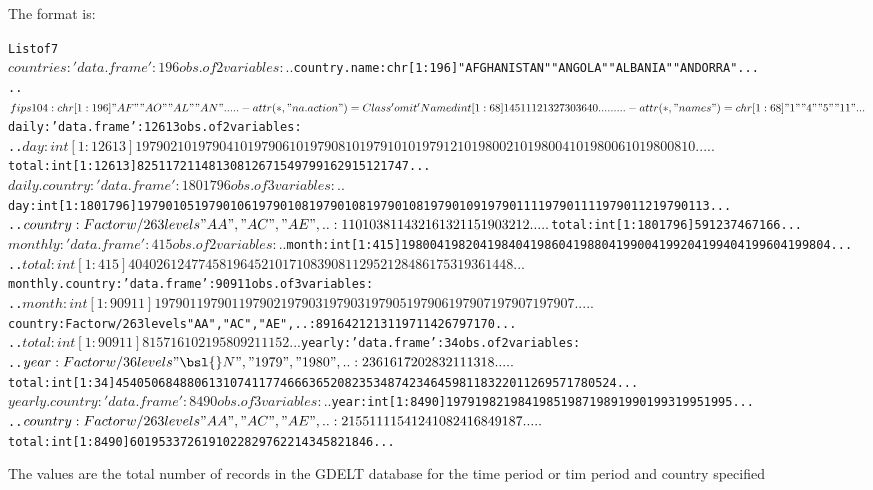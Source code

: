 \documentclass[a4paper]{book}
\begin{document}
\begin{Format}
The format is:
\begin{alltt}List of 7
 $ countries      :'data.frame':	196 obs. of  2 variables:
  ..$ country.name: chr [1:196] "AFGHANISTAN" "ANGOLA" "ALBANIA" "ANDORRA" ...
  ..$ fips104     : chr [1:196] "AF" "AO" "AL" "AN" ...
  ..- attr(*, "na.action")=Class 'omit'  Named int [1:68] 1 4 5 11 12 13 27 30 36 40 ...
  .. .. ..- attr(*, "names")= chr [1:68] "1" "4" "5" "11" ...
 $ daily          :'data.frame':	12613 obs. of  2 variables:
  ..$ day  : int [1:12613] 19790210 19790410 19790610 19790810 19791010 19791210 19800210 19800410 19800610 19800810 ...
  ..$ total: int [1:12613] 825 1172 1148 1308 1267 1549 799 1629 1512 1747 ...
 $ daily.country  :'data.frame':	1801796 obs. of  3 variables:
  ..$ day    : int [1:1801796] 19790105 19790106 19790108 19790108 19790108 19790109 19790111 19790111 19790112 19790113 ...
  ..$ country: Factor w/ 263 levels "AA","AC","AE",..: 110 103 81 143 216 132 115 190 32 12 ...
  ..$ total  : int [1:1801796] 59 1 23 7 4 6 7 1 6 6 ...
 $ monthly        :'data.frame':	415 obs. of  2 variables:
  ..$ month: int [1:415] 198004 198204 198404 198604 198804 199004 199204 199404 199604 199804 ...
  ..$ total: int [1:415] 40402 61247 74581 96452 101710 83908 112952 128486 175319 361448 ...
 $ monthly.country:'data.frame':	90911 obs. of  3 variables:
  ..$ month  : int [1:90911] 197901 197901 197902 197903 197903 197905 197906 197907 197907 197907 ...
  ..$ country: Factor w/ 263 levels "AA","AC","AE",..: 89 164 212 131 197 114 26 7 97 170 ...
  ..$ total  : int [1:90911] 8 157 16 10 2 195 80 92 11 152 ...
 $ yearly         :'data.frame':	34 obs. of  2 variables:
  ..$ year : Factor w/ 36 levels "\bsl{}N","1979","1980",..: 23 6 16 17 20 28 32 11 13 18 ...
  ..$ total: int [1:34] 4540506 848806 1310741 1774666 3652082 3534874 23464598 1183220 1126957 1780524 ...
 $ yearly.country :'data.frame':	8490 obs. of  3 variables:
  ..$ year   : int [1:8490] 1979 1982 1984 1985 1987 1989 1990 1993 1995 1995 ...
  ..$ country: Factor w/ 263 levels "AA","AC","AE",..: 215 51 11 154 124 108 241 68 49 187 ...
  ..$ total  : int [1:8490] 601 95 3 37 2619 10228 29762 2143 458 21846 ...
  \end{alltt}

\end{Format}
%
\begin{Details}\relax
The values are the total number of records in the GDELT database for the time period or tim period and country specified
\end{Details}
\end{document}
